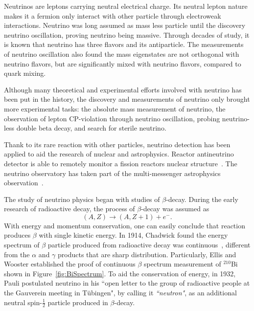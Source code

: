\label{Ch1}

    Neutrinos are leptons carrying neutral electrical charge.
    Its neutral lepton nature makes it a fermion only interact with other particle through electroweak interactions.
    Neutrino was long assumed as mass less particle until the discovery neutrino oscillation, proving neutrino being massive.
    Through decades of study, it is known that neutrino has three flavors and its antiparticle.
    The measurements of neutrino oscillation also found the mass eigenstates are not orthogonal with neutrino flavors, but are significantly mixed with neutrino flavors, compared to quark mixing.
    
    Although many theoretical and experimental efforts involved with neutrino has been put in the history, the discovery and measurements of neutrino only brought more experimental tasks: the absolute mass measurement of neutrino, the observation of lepton CP-violation through neutrino oscillation, probing neutrino-less double beta decay, and  search for sterile neutrino.
    
    Thank to its rare reaction with other particles, neutrino detection has been applied to aid the research of nuclear and astrophysics.
    Reactor antineutrino detector is able to remotely monitor a fission reactors nuclear structure~\cite{bib:DYBSpectrum, bib:DYBEvo}. 
    The neutrino observatory has taken part of the multi-messenger astrophysics observation~\cite{bib:IceCube}.

\label{Ch1Sec2}
    
    The study of neutrino physics began with studies of $\beta$-decay.
    During the early research of radioactive decay, the process of $\beta$-decay was assumed as
    \begin{equation}
    (A, Z) \rightarrow (A, Z+1) + e^-.
    \end{equation}
    With energy and momentum conservation, one can easily conclude that reaction produces $\beta$ with single kinetic energy.
    In 1914, Chadwick found the energy spectrum of $\beta$ particle produced from radioactive decay was continuous~\cite{bib:Chadwick}, different from the $\alpha$ and $\gamma$ products that are sharp distribution.
    Particularly, Ellis and Wooster established the proof of continuous $\beta$ spectrum measurement of $^{210}$Bi~\cite{bib:EandW} shown in Figure~\ref{fig:BiSpectrum}.
    To aid the conservation of energy, in 1932, Pauli postulated neutrino in his ``open letter to the group of radioactive people at the Gauverein meeting in Tübingen", by calling it \textit{``neutron"}, as an additional neutral spin-$\frac{1}{2}$ particle produced in $\beta$-decay.

